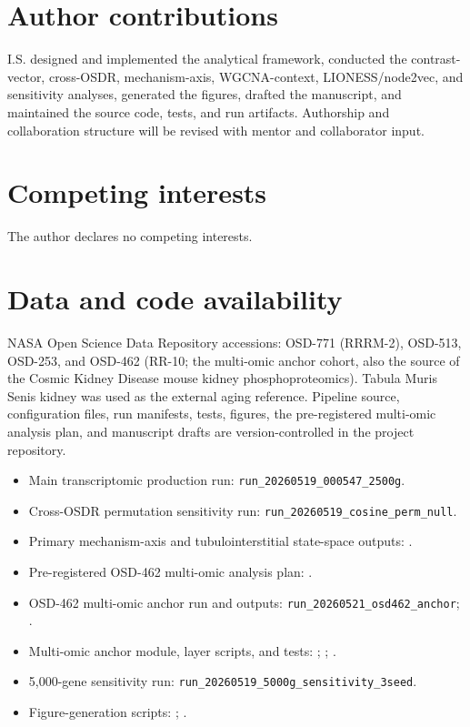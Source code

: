 \documentclass[11pt]{article}
\newcommand{\code}[1]{\texttt{#1}}
\begin{document}
\section*{Author contributions}
I.S. designed and implemented the analytical framework, conducted the contrast-vector, cross-OSDR, mechanism-axis, WGCNA-context, LIONESS/node2vec, and sensitivity analyses, generated the figures, drafted the manuscript, and maintained the source code, tests, and run artifacts. Authorship and collaboration structure will be revised with mentor and collaborator input.

\section*{Competing interests}
The author declares no competing interests.

\section*{Data and code availability}
NASA Open Science Data Repository accessions: OSD-771 (RRRM-2), OSD-513, OSD-253, and OSD-462 (RR-10; the multi-omic anchor cohort, also the source of the Cosmic Kidney Disease mouse kidney phosphoproteomics). Tabula Muris Senis kidney was used as the external aging reference. Pipeline source, configuration files, run manifests, tests, figures, the pre-registered multi-omic analysis plan, and manuscript drafts are version-controlled in the project repository.

\begin{itemize}
  \item Main transcriptomic production run: \code{run\_20260519\_000547\_2500g}.
  \item Cross-OSDR permutation sensitivity run: \code{run\_20260519\_cosine\_perm\_null}.
  \item Primary mechanism-axis and tubulointerstitial state-space outputs: .
  \item Pre-registered OSD-462 multi-omic analysis plan: .
  \item OSD-462 multi-omic anchor run and outputs: \code{run\_20260521\_osd462\_anchor}; .
  \item Multi-omic anchor module, layer scripts, and tests: ; ; .
  \item 5,000-gene sensitivity run: \code{run\_20260519\_5000g\_sensitivity\_3seed}.
  \item Figure-generation scripts: ; .
\end{itemize}
\end{document}
